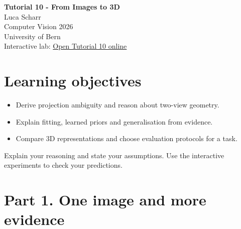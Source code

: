 \documentclass[11pt,a4paper]{article}
\begin{document}
\begin{center}
{\Large\bfseries Tutorial 10 - From Images to 3D}\\[2mm]
Luca Scharr\\
Computer Vision 2026\\
University of Bern\\[1mm]
Interactive lab: \href{https://sosekie.github.io/Unibe-CVG-CV-Interactive-Labs/tutorial-10/}{Open Tutorial 10 online}
\end{center}
\section*{Learning objectives}
\begin{itemize}[nosep]
\item Derive projection ambiguity and reason about two-view geometry.
\item Explain fitting, learned priors and generalisation from evidence.
\item Compare 3D representations and choose evaluation protocols for a task.
\end{itemize}
Explain your reasoning and state your assumptions.
Use the interactive experiments to check your predictions.
\section*{Part 1. One image and more evidence}
\end{document}
